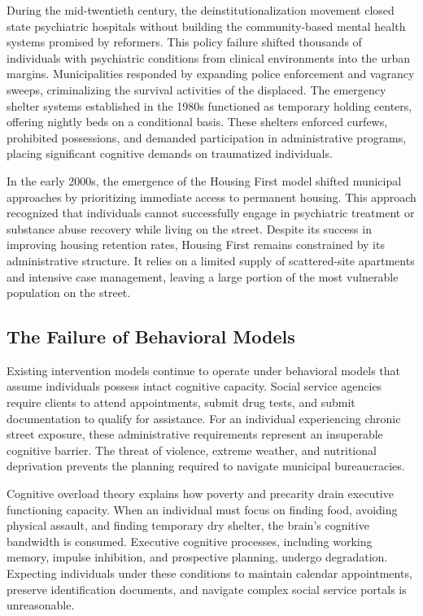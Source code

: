\documentclass[12pt]{article}
\begin{document}
During the mid-twentieth century, the deinstitutionalization movement closed state psychiatric hospitals without building the community-based mental health systems promised by reformers. This policy failure shifted thousands of individuals with psychiatric conditions from clinical environments into the urban margins. Municipalities responded by expanding police enforcement and vagrancy sweeps, criminalizing the survival activities of the displaced. The emergency shelter systems established in the 1980s functioned as temporary holding centers, offering nightly beds on a conditional basis. These shelters enforced curfews, prohibited possessions, and demanded participation in administrative programs, placing significant cognitive demands on traumatized individuals.

In the early 2000s, the emergence of the Housing First model shifted municipal approaches by prioritizing immediate access to permanent housing. This approach recognized that individuals cannot successfully engage in psychiatric treatment or substance abuse recovery while living on the street. Despite its success in improving housing retention rates, Housing First remains constrained by its administrative structure. It relies on a limited supply of scattered-site apartments and intensive case management, leaving a large portion of the most vulnerable population on the street.

\subsection{The Failure of Behavioral Models}
Existing intervention models continue to operate under behavioral models that assume individuals possess intact cognitive capacity. Social service agencies require clients to attend appointments, submit drug tests, and submit documentation to qualify for assistance. For an individual experiencing chronic street exposure, these administrative requirements represent an insuperable cognitive barrier. The threat of violence, extreme weather, and nutritional deprivation prevents the planning required to navigate municipal bureaucracies.

Cognitive overload theory explains how poverty and precarity drain executive functioning capacity. When an individual must focus on finding food, avoiding physical assault, and finding temporary dry shelter, the brain's cognitive bandwidth is consumed. Executive cognitive processes, including working memory, impulse inhibition, and prospective planning, undergo degradation. Expecting individuals under these conditions to maintain calendar appointments, preserve identification documents, and navigate complex social service portals is unreasonable.
\end{document}
